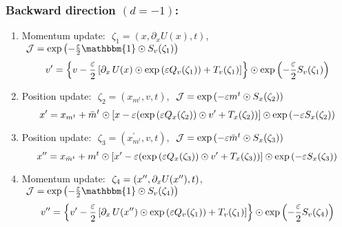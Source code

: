 \documentclass[../main.tex]{subfiles}
\begin{document}
\subsubsection{Backward direction \texorpdfstring{$(d = -1)$}{(d = -1)}:}%
\label{subsubsec:augmented_leapfrog_equations_backward}
%
\begin{enumerate}
  \item Momentum update: $\,\,\zeta_{1} = (x, \partial_{x} U(x), t)$,
    $\,\, \mathcal{J} = \exp{\left(-\frac{\eps}{2}\mathbbm{1}\odot S_{v}(\zeta_1)\right)}$
    \vspace{-10pt}
    \begin{equation}
      v^{\prime} = {\left\{v - \frac{\eps}{2}\left[\partial_{x}\,U(x)\odot \exp{\left(\eps Q_{v}(\zeta_{1})\right)}%
            + T_{v}(\zeta_{1})\right]\right\}} \odot \exp{\left(-\frac{\eps}{2}S_{v}(\zeta_{1})\right)}
    \end{equation}
    \vspace{-40pt}
  \item Position update: $\,\,\zeta_{2} = (x_{m^{t}}, v, t)$,
    $\,\, \mathcal{J} = \exp{\left(-{\varepsilon}m^{t}\odot S_{x}(\zeta_2)\right)}$
    \vspace{-10pt}
    \begin{equation}
      \xp = x_{m^{t}} + \bar{m}^{t}\odot%
        {\left[x - \eps{\left(\exp{\left(\eps Q_{x}(\zeta_{2})\right)}\odot \vp%
                + T_{x}(\zeta_{2})\right)}\right]}\odot \exp{\left(-\eps S_{x}(\zeta_{2})\right)}
    \end{equation}
    \vspace{-40pt}
  \item Position update: $\,\,\zeta_{3} = (x^{\prime}_{m^{t}}, v, t)$,
    $\,\, \mathcal{J} = \exp{\left(-{\varepsilon}\bar{m}^{t}\odot S_{x}(\zeta_3)\right)}$
    \vspace{-10pt}
    \begin{equation}
      \xpp = x_{\bar{m}^{t}} + m^{t}\odot%
        {\left[\xp - \eps{\left(\exp{\left(\eps Q_{x}(\zeta_{3})\right)}\odot \vp%
                + T_{x}(\zeta_{3})\right)}\right]}\odot \exp{\left(-\eps S_{x}(\zeta_{3})\right)}
    \end{equation}
    \vspace{-40pt}
  \item Momentum update: $\,\,\zeta_{4} = ({x^{\prime\prime}}, \partial_{x} U({x^{\prime\prime}}), t)$,
    $\,\, \mathcal{J} = \exp{\left(-\frac{\eps}{2}\mathbbm{1}\odot S_{v}(\zeta_4)\right)}$
    \vspace{-10pt}
    \begin{equation}
      v^{\prime\prime} = {\left\{\vp - \frac{\eps}{2}\left[\partial_{x}\,U(\xpp)\odot%
            \exp{\left(\eps Q_{v}(\zeta_{1})\right)}
            + T_{v}(\zeta_{1})\right]\right\}}\odot 
            \exp{\left(-\frac{\eps}{2}S_{v}(\zeta_{4})\right)}
    \end{equation}
\end{enumerate}
%
\end{document}
